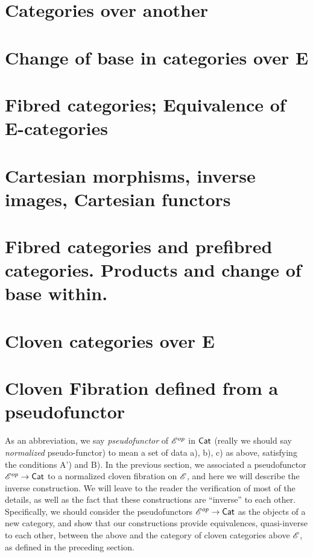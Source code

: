 \documentclass[../main.tex]{subfiles}
\begin{document}
\section{Categories over another}

\section{Change of base in categories over E}

\section{Fibred categories; Equivalence of E-categories}

\section{Cartesian morphisms, inverse images, Cartesian functors}

\section{Fibred categories and prefibred categories. Products and change of base within.}

\section{Cloven categories over E}

\section{Cloven Fibration defined from a pseudofunctor}

As an abbreviation, we say \emph{pseudofunctor} of $\mathscr{E}^{op}$ in $\mathsf{Cat}$ (really we should say \emph{normalized} pseudo-functor) to mean a set of data a), b), c) as above, satisfying the conditions A') and B).
In the previous section, we associated a pseudofunctor $\mathscr{E}^{op}\to\mathsf{Cat}$ to a normalized cloven fibration on $\mathscr{E}$, and here we will describe the inverse construction.
We will leave to the reader the verification of most of the details, as well as the fact that these constructions are ``inverse'' to each other. 
Specifically, we should consider the pseudofunctors $\mathscr{E}^{op} \to \mathsf{Cat}$ as the objects of a new category, and show that our constructions provide equivalences, quasi-inverse to each other, between the above and the category of cloven categories above $\mathscr{E}$, as defined in the preceding section.
\end{document}
